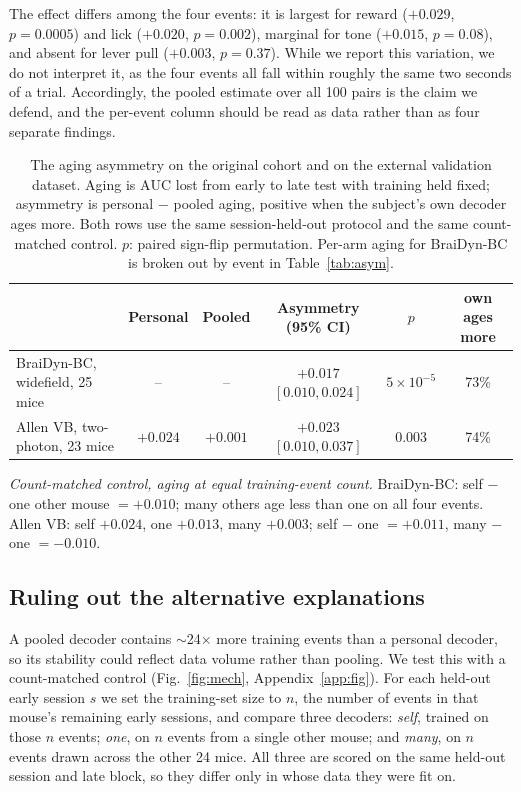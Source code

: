 \documentclass{article}
\newcommand{\auc}{\mathrm{AUC}}
\begin{document}
The effect differs among the four events: it is largest for reward ($+0.029$, $p = 0.0005$) and lick
($+0.020$, $p = 0.002$), marginal for tone ($+0.015$, $p = 0.08$), and absent for lever pull
($+0.003$, $p = 0.37$). While we report this variation, we do not interpret it, as the four events
all fall within roughly the same two seconds of a trial. Accordingly, the pooled estimate over all
100 pairs is the claim we defend, and the per-event column should be read as data rather than as
four separate findings.

\begin{table}[t]\centering
\caption{The aging asymmetry on the original cohort and on the external validation dataset. Aging
is $\auc$ lost from early to late test with training held fixed; asymmetry is personal $-$ pooled
aging, positive when the subject's own decoder ages more. Both rows use the same session-held-out
protocol and the same count-matched control. $p$: paired sign-flip permutation. Per-arm aging for BraiDyn-BC is broken out by event in Table~\ref{tab:asym}.}
\label{tab:allen}
\setlength{\tabcolsep}{3pt}
{\small
\begin{tabular}{lccccc}
\toprule
& Personal & Pooled & Asymmetry (95\% CI) & $p$ & own ages more \\
\midrule
BraiDyn-BC, widefield, 25 mice & -- & -- & $+0.017$ $[0.010, 0.024]$ & $5\times10^{-5}$ & 73\% \\
Allen VB, two-photon, 23 mice & $+0.024$ & $+0.001$ & $+0.023$ $[0.010, 0.037]$ & 0.003 & 74\% \\
\bottomrule
\end{tabular}}

\vspace{3pt}
\begin{minipage}{0.95\linewidth}\small\raggedright
\emph{Count-matched control, aging at equal training-event count.} BraiDyn-BC: self $-$ one other
mouse $= +0.010$; many others age less than one on all four events. Allen VB: self $+0.024$, one
$+0.013$, many $+0.003$; self $-$ one $= +0.011$, many $-$ one $= -0.010$.
\end{minipage}
\end{table}


\subsection{Ruling out the alternative explanations}
\label{sec:matched}
A pooled decoder contains $\sim$24$\times$ more training events than a personal decoder, so its
stability could reflect data volume rather than pooling. We test this with a count-matched control (Fig.~\ref{fig:mech}, Appendix~\ref{app:fig}). For each held-out early session $s$ we set the training-set size to
$n$, the number of events in that mouse's remaining early sessions, and compare three decoders:
\emph{self}, trained on those $n$ events; \emph{one}, on $n$ events from a single other mouse; and
\emph{many}, on $n$ events drawn across the other 24 mice. All three are scored on the same held-out
session and late block, so they differ only in whose data they were fit on.
\end{document}
